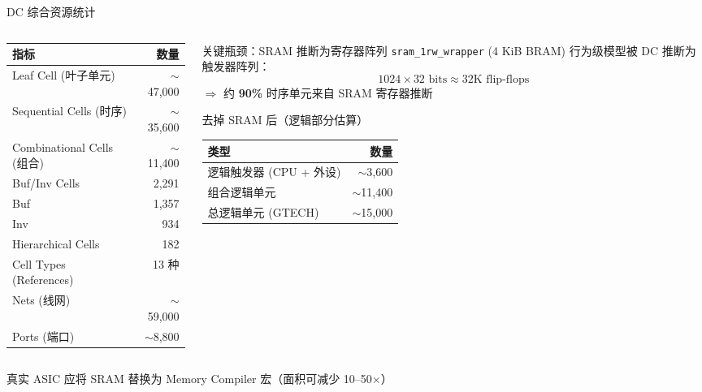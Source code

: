 \documentclass[aspectratio=169, 10pt, UTF8]{ctexbeamer}
\begin{document}
\begin{frame}{DC 综合资源统计}
  \begin{columns}[T]
    \begin{column}{0.52\textwidth}
      \begin{table}[h]
        \centering
        \footnotesize
        \begin{tabular}{lr}
          \toprule
          \textbf{指标} & \textbf{数量} \\
          \midrule
          Leaf Cell (叶子单元) & $\sim$47,000 \\
          Sequential Cells (时序) & $\sim$35,600 \\
          Combinational Cells (组合) & $\sim$11,400 \\
          Buf/Inv Cells & 2,291 \\
          \quad Buf & 1,357 \\
          \quad Inv & 934 \\
          Hierarchical Cells & 182 \\
          Cell Types (References) & 13 种 \\
          Nets (线网) & $\sim$59,000 \\
          Ports (端口) & $\sim$8,800 \\
          \bottomrule
        \end{tabular}
      \end{table}
    \end{column}
    \begin{column}{0.48\textwidth}
      \begin{alertblock}{关键瓶颈：SRAM 推断为寄存器阵列}
        \texttt{sram\_1rw\_wrapper} (4 KiB BRAM) 行为级模型被 DC 推断为触发器阵列：
        \[
        1024 \times 32\text{ bits} \approx 32\text{K flip-flops}
        \]
        $\Rightarrow$ 约 \textbf{90\%} 时序单元来自 SRAM 寄存器推断
      \end{alertblock}

      \begin{exampleblock}{去掉 SRAM 后（逻辑部分估算）}
        \footnotesize
        \begin{tabular}{lr}
          \toprule
          \textbf{类型} & \textbf{数量} \\
          \midrule
          逻辑触发器 (CPU + 外设) & $\sim$3,600 \\
          组合逻辑单元 & $\sim$11,400 \\
          总逻辑单元 (GTECH) & $\sim$15,000 \\
          \bottomrule
        \end{tabular}
      \end{exampleblock}
    \end{column}
  \end{columns}

  \vspace{4pt}
  \begin{center}
    {\footnotesize\color{ieeeRed} 真实 ASIC 应将 SRAM 替换为 Memory Compiler 宏（面积可减少 10--50$\times$）}
  \end{center}
\end{frame}
\end{document}
